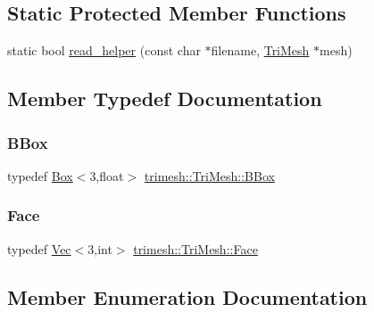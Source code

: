 \subsection*{Static Protected Member Functions}
\begin{DoxyCompactItemize}
\item 
static bool \hyperlink{classtrimesh_1_1TriMesh_a7157944d3f98868565e8ad9312c89ac4}{read\+\_\+helper} (const char $\ast$filename, \hyperlink{classtrimesh_1_1TriMesh}{Tri\+Mesh} $\ast$mesh)
\end{DoxyCompactItemize}


\subsection{Member Typedef Documentation}
\mbox{\label{classtrimesh_1_1TriMesh_a32708e131e1ccac6238a226edf5a43f6}} 
\subsubsection{\texorpdfstring{B\+Box}{BBox}}
{\footnotesize\ttfamily typedef \hyperlink{classtrimesh_1_1Box}{Box}$<$3,float$>$ \hyperlink{classtrimesh_1_1TriMesh_a32708e131e1ccac6238a226edf5a43f6}{trimesh\+::\+Tri\+Mesh\+::\+B\+Box}}

\mbox{\label{classtrimesh_1_1TriMesh_a06cb64bb6435d5cf4d7b24d2950fe8e7}} 
\subsubsection{\texorpdfstring{Face}{Face}}
{\footnotesize\ttfamily typedef \hyperlink{classtrimesh_1_1Vec}{Vec}$<$3,int$>$ \hyperlink{classtrimesh_1_1TriMesh_a06cb64bb6435d5cf4d7b24d2950fe8e7}{trimesh\+::\+Tri\+Mesh\+::\+Face}}



\subsection{Member Enumeration Documentation}
\mbox{\label{classtrimesh_1_1TriMesh_a14cad8a68a58b192da144c9c44c2370a}} 
